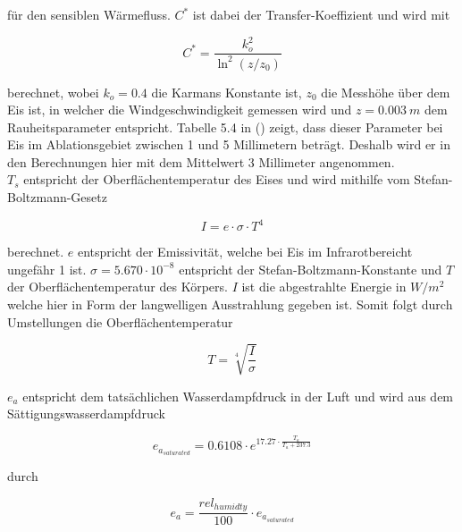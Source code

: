 \documentclass[11pt,a4paper]{article}
\begin{document}
für den sensiblen Wärmefluss. $C^*$ ist dabei der Transfer-Koeffizient und wird mit 

\begin{equation}\label{eq:Transfer-Koeffizient}
C^{*}=\frac{k_{o}^{2}}{\ln ^{2}\left(z / z_{0}\right)}
\end{equation}

berechnet, wobei $k_{o}=0.4$ die Karmans Konstante ist, $z_{0}$ die Messhöhe über dem Eis ist, in welcher die Windgeschwindigkeit gemessen wird und $z=0.003~m$ dem Rauheitsparameter entspricht. Tabelle 5.4 in \citeauthor{ThePhysicsOfGlaciers} (\citeyear[155]{ThePhysicsOfGlaciers}) zeigt, dass dieser Parameter bei Eis im Ablationsgebiet zwischen 1 und 5 Millimetern beträgt. Deshalb wird er in den Berechnungen hier mit dem Mittelwert 3 Millimeter angenommen.\\ %

$T_s$ entspricht der Oberflächentemperatur des Eises und wird mithilfe vom Stefan-Boltzmann-Gesetz 

\begin{equation}\label{eq:Boltzmann-Gesetz}
I = e \cdot \sigma \cdot T^4
\end{equation}

berechnet. $e$ entspricht der Emissivität, welche bei Eis im Infrarotbereicht ungefähr 1 ist. $\sigma=5.670 \cdot 10^{-8}$ entspricht der Stefan-Boltzmann-Konstante und $T$ der Oberflächentemperatur des Körpers. $I$ ist die abgestrahlte Energie in $W/m^2$ welche hier in Form der langwelligen Ausstrahlung gegeben ist. Somit folgt durch Umstellungen die Oberflächentemperatur

\begin{equation}\label{eq:Oberflächentemperatur}
T = \sqrt[4]{\frac{I}{\sigma}}
\end{equation}


$e_a$ entspricht dem tatsächlichen Wasserdampfdruck in der Luft und wird aus dem Sättigungswasserdampfdruck


\begin{equation}
e_{a_{saturated}}=0.6108 \cdot e^{17.27 \cdot \frac{T_a}{T_a + 237.3}}
\end{equation}

durch

\begin{equation}
e_a = \frac{rel_{humidty}}{100} \cdot e_{a_{saturated}}
\end{equation}
\end{document}
